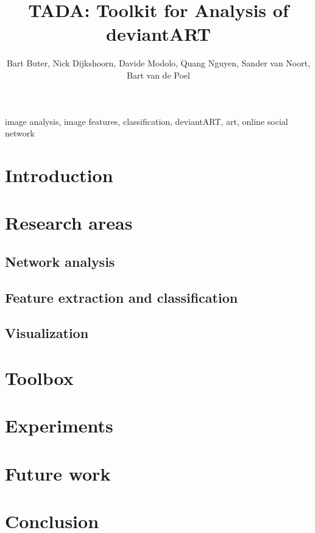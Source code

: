 \documentclass[10pt,journal,compsoc]{IEEEtran}
\begin{document}
\title{TADA: Toolkit for Analysis of deviantART}
\author{Bart Buter, Nick Dijkshoorn, Davide Modolo, Quang Nguyen, Sander van Noort, Bart van de Poel}

\maketitle


\begin{abstract}

\end{abstract}


\begin{keywords}
image analysis, image features, classification, deviantART, art, online social network
\end{keywords}


\section{Introduction}



\section{Research areas}
	\subsection{Network analysis}
	
	\subsection{Feature extraction and classification}
	
	\subsection{Visualization}
	


\section{Toolbox}


\section{Experiments}



\section{Future work}


\section{Conclusion}


%

\nocite{*}



\pagebreak
\tableofcontents
\end{document}
